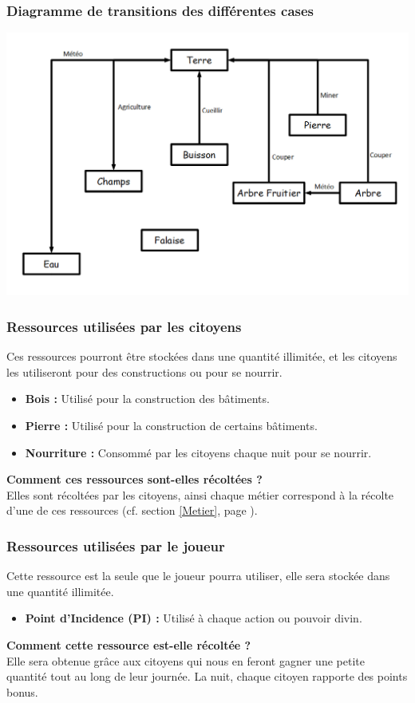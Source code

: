 \documentclass[a4paper]{article}
\newcommand{\alinea}{\hspace*{0.5cm}}
\begin{document}
        \subsubsection{Diagramme de transitions des différentes cases}
          \includegraphics[scale=0.35]{img/DiagrammeTransitionCases.png} 
          \label{DiagCase}
        
        \subsubsection{Ressources utilisées par les citoyens}
          \alinea Ces ressources pourront être stockées dans une quantité illimitée, et les citoyens les utiliseront pour des constructions ou pour se nourrir.
          \begin{itemize} \small
            \item \textbf{Bois :} Utilisé pour la construction des bâtiments.
            \item \textbf{Pierre :} Utilisé pour la construction de certains bâtiments.
            \item \textbf{Nourriture :} Consommé par les citoyens chaque nuit pour se nourrir.
          \end{itemize} \normalsize
          \textbf{Comment ces ressources sont-elles récoltées ? }\\
          \alinea Elles sont récoltées par les citoyens, ainsi chaque métier correspond à la récolte d'une de ces ressources (cf. section \ref{Metier}, page \pageref{Metier}).

        \subsubsection{Ressources utilisées par le joueur}
          \alinea Cette ressource est la seule que le joueur pourra utiliser, elle sera stockée dans une quantité illimitée.
          \begin{itemize} \small
            \item \textbf{Point d'Incidence (PI) :} Utilisé à chaque action ou pouvoir divin.
          \end{itemize} \normalsize
          \textbf{Comment cette ressource est-elle récoltée ? }\\
          \alinea Elle sera obtenue grâce aux citoyens qui nous en feront gagner une petite quantité tout au long de leur journée. La nuit, chaque citoyen rapporte des points bonus.
\end{document}
